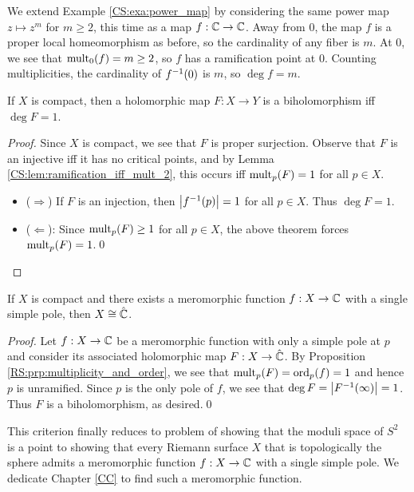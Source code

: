 \documentclass[../Moduli_Spaces_of_Riemann_Surfaces.tex]{subfiles}
\begin{document}
    \begin{example}
        We extend Example \ref{CS:exa:power_map} by considering the same power map $z\mapsto z^m$ for $m\geq2$, this time as a map $f:\mathbb{C}\to\mathbb{C}$. Away from $0$, the map $f$ is a proper local homeomorphism as before, so the cardinality of any fiber is $m$. At $0$, we see that $\operatorname{mult}_0\!\left(f\right)=m\geq2$, so $f$ has a ramification point at $0$. Counting multiplicities, the cardinality of $f^{-1}\!\left(0\right)$ is $m$, so $\deg f=m$.\exqed
    \end{example}
    \begin{corollary}
        If $X$ is compact, then a holomorphic map $F:X\to Y$ is a biholomorphism iff $\deg F=1$.
    \end{corollary}
    \begin{proof}
        Since $X$ is compact, we see that $F$ is proper surjection. Observe that $F$ is an injective iff it has no critical points, and by Lemma \ref{CS:lem:ramification_iff_mult_2}, this occurs iff $\operatorname{mult}_p\!\left(F\right)=1$ for all $p\in X$.
        \begin{itemize}
            \item ($\Rightarrow$) If $F$ is an injection, then $\left|f^{-1}\!\left(p\right)\right|=1$ for all $p\in X$. Thus $\deg F=1$.
                \vspace{-0.05in}
            \item ($\Leftarrow$): Since $\operatorname{mult}_p\!\left(F\right)\geq1$ for all $p\in X$, the above theorem forces $\operatorname{mult}_p\!\left(F\right)=1$.\qed
        \end{itemize}
    \end{proof}
    \begin{corollary}\label{CS:cor:exists_meromorphic_implies_biholomorphic_Riemann_sphere}
        If $X$ is compact and there exists a meromorphic function $f:X\to\mathbb{C}$ with a single simple pole, then $X\cong\hat{\mathbb{C}}$.
    \end{corollary}
    \begin{proof}
        Let $f:X\to\mathbb{C}$ be a meromorphic function with only a simple pole at $p$ and consider its associated holomorphic map $F:X\to\hat{\mathbb{C}}$. By Proposition \ref{RS:prp:multiplicity_and_order}, we see that $\operatorname{mult}_p\!\left(F\right)=\operatorname{ord}_p\!\left(f\right)=1$ and hence $p$ is unramified. Since $p$ is the only pole of $f$, we see that $\deg F=\left|F^{-1}\!\left(\infty\right)\right|=1$. Thus $F$ is a biholomorphism, as desired.\qed
    \end{proof}
    \begin{remark}
        This criterion finally reduces to problem of showing that the moduli space of $S^2$ is a point to showing that every Riemann surface $X$ that is topologically the sphere admits a meromorphic function $f:X\to\mathbb{C}$ with a single simple pole. We dedicate Chapter \ref{CC} to find such a meromorphic function.\exqed
    \end{remark}
\end{document}
